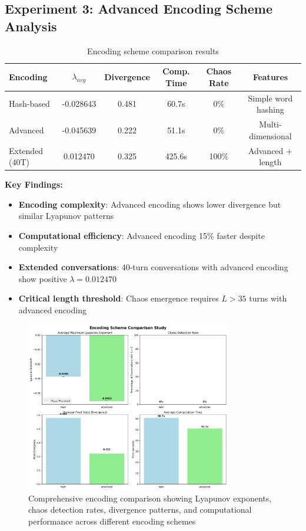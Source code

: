 \documentclass[11pt,a4paper]{article}
\begin{document}
\subsection{Experiment 3: Advanced Encoding Scheme Analysis}

\begin{table}[ht]
\centering
\caption{Encoding scheme comparison results}
\begin{tabular}{@{}lccccc@{}}
\toprule
Encoding & $\lambda_{avg}$ & Divergence & Comp. Time & Chaos Rate & Features \\
\midrule
Hash-based & -0.028643 & 0.481 & 60.7s & 0\% & Simple word hashing \\
Advanced & -0.045639 & 0.222 & 51.1s & 0\% & Multi-dimensional \\
\midrule
Extended (40T) & 0.012470 & 0.325 & 425.6s & 100\% & Advanced + length \\
\bottomrule
\end{tabular}
\end{table}

\textbf{Key Findings:}
\begin{itemize}
    \item \textbf{Encoding complexity}: Advanced encoding shows lower divergence but similar Lyapunov patterns
    \item \textbf{Computational efficiency}: Advanced encoding 15\% faster despite complexity
    \item \textbf{Extended conversations}: 40-turn conversations with advanced encoding show positive $\lambda = 0.012470$
    \item \textbf{Critical length threshold}: Chaos emergence requires $L > 35$ turns with advanced encoding
\end{itemize}

\begin{figure}[ht]
\centering
\includegraphics[width=0.8\textwidth]{final_visualizations/encoding_comparison_study.png}
\caption{Comprehensive encoding comparison showing Lyapunov exponents, chaos detection rates, divergence patterns, and computational performance across different encoding schemes}
\label{fig:encoding_comparison}
\end{figure}
\end{document}
